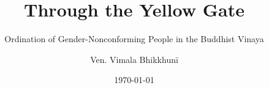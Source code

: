 \clearpage
\thispagestyle{empty}
\titlehead{}
\title{Through the Yellow Gate}
\subtitle{Ordination of Gender-Nonconforming People in the Buddhist Vinaya}
\author{Ven. Vimala Bhikkhunī}
\date{\today}
\maketitle
